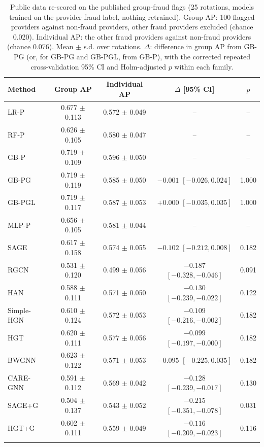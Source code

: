 \documentclass[pdflatex,sn-vancouver-num]{sn-jnl}
\begin{document}
\begin{table}[h]
\caption{Public data re-scored on the published group-fraud flags (25 rotations, models trained on the provider fraud label, nothing retrained). Group AP: 100 flagged providers against non-fraud providers, other fraud providers excluded (chance 0.020). Individual AP: the other fraud providers against non-fraud providers (chance 0.076). Mean $\pm$ s.d. over rotations. $\Delta$: difference in group AP from GB-PG (or, for GB-PG and GB-PGL, from GB-P), with the corrected repeated cross-validation 95\% CI and Holm-adjusted $p$ within each family.}\label{tab:grouplabels}
\scriptsize
\begin{tabular}{@{}lcccc@{}}
\toprule
Method & Group AP & Individual AP & $\Delta$ [95\% CI] & $p$ \\
\midrule
LR-P & 0.677 $\pm$ 0.113 & 0.572 $\pm$ 0.049 & -- & -- \\
RF-P & 0.626 $\pm$ 0.105 & 0.580 $\pm$ 0.047 & -- & -- \\
GB-P & 0.719 $\pm$ 0.109 & 0.596 $\pm$ 0.050 & -- & -- \\
GB-PG & 0.719 $\pm$ 0.119 & 0.585 $\pm$ 0.050 & $-0.001$ $[-0.026, 0.024]$ & 1.000 \\
GB-PGL & 0.719 $\pm$ 0.117 & 0.587 $\pm$ 0.053 & $+0.000$ $[-0.035, 0.035]$ & 1.000 \\
MLP-P & 0.656 $\pm$ 0.105 & 0.581 $\pm$ 0.044 & -- & -- \\
SAGE & 0.617 $\pm$ 0.158 & 0.574 $\pm$ 0.055 & $-0.102$ $[-0.212, 0.008]$ & 0.182 \\
RGCN & 0.531 $\pm$ 0.120 & 0.499 $\pm$ 0.056 & $-0.187$ $[-0.328, -0.046]$ & 0.091 \\
HAN & 0.588 $\pm$ 0.111 & 0.571 $\pm$ 0.050 & $-0.130$ $[-0.239, -0.022]$ & 0.122 \\
Simple-HGN & 0.610 $\pm$ 0.124 & 0.572 $\pm$ 0.053 & $-0.109$ $[-0.216, -0.002]$ & 0.182 \\
HGT & 0.620 $\pm$ 0.111 & 0.577 $\pm$ 0.056 & $-0.099$ $[-0.197, -0.000]$ & 0.182 \\
BWGNN & 0.623 $\pm$ 0.122 & 0.571 $\pm$ 0.053 & $-0.095$ $[-0.225, 0.035]$ & 0.182 \\
CARE-GNN & 0.591 $\pm$ 0.112 & 0.569 $\pm$ 0.042 & $-0.128$ $[-0.239, -0.017]$ & 0.130 \\
SAGE+G & 0.504 $\pm$ 0.137 & 0.543 $\pm$ 0.052 & $-0.215$ $[-0.351, -0.078]$ & 0.031 \\
HGT+G & 0.602 $\pm$ 0.111 & 0.559 $\pm$ 0.049 & $-0.116$ $[-0.209, -0.023]$ & 0.116 \\
\botrule
\end{tabular}
\end{table}
\end{document}
